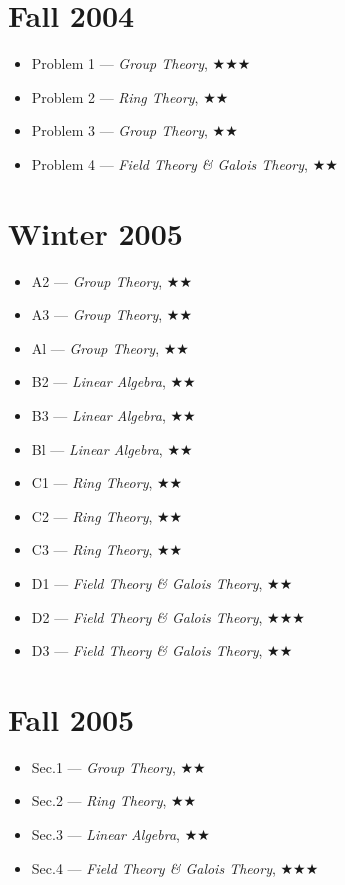 \documentclass[11pt,letterpaper]{book}
\begin{document}
\section*{Fall 2004}
\begin{itemize}
\item Problem 1 --- \textit{Group Theory}, $\bigstar\bigstar\bigstar$
\item Problem 2 --- \textit{Ring Theory}, $\bigstar\bigstar$
\item Problem 3 --- \textit{Group Theory}, $\bigstar\bigstar$
\item Problem 4 --- \textit{Field Theory \& Galois Theory}, $\bigstar\bigstar$
\end{itemize}

\section*{Winter 2005}
\begin{itemize}
\item A2 --- \textit{Group Theory}, $\bigstar\bigstar$
\item A3 --- \textit{Group Theory}, $\bigstar\bigstar$
\item Al --- \textit{Group Theory}, $\bigstar\bigstar$
\item B2 --- \textit{Linear Algebra}, $\bigstar\bigstar$
\item B3 --- \textit{Linear Algebra}, $\bigstar\bigstar$
\item Bl --- \textit{Linear Algebra}, $\bigstar\bigstar$
\item C1 --- \textit{Ring Theory}, $\bigstar\bigstar$
\item C2 --- \textit{Ring Theory}, $\bigstar\bigstar$
\item C3 --- \textit{Ring Theory}, $\bigstar\bigstar$
\item D1 --- \textit{Field Theory \& Galois Theory}, $\bigstar\bigstar$
\item D2 --- \textit{Field Theory \& Galois Theory}, $\bigstar\bigstar\bigstar$
\item D3 --- \textit{Field Theory \& Galois Theory}, $\bigstar\bigstar$
\end{itemize}

\section*{Fall 2005}
\begin{itemize}
\item Sec.1 --- \textit{Group Theory}, $\bigstar\bigstar$
\item Sec.2 --- \textit{Ring Theory}, $\bigstar\bigstar$
\item Sec.3 --- \textit{Linear Algebra}, $\bigstar\bigstar$
\item Sec.4 --- \textit{Field Theory \& Galois Theory}, $\bigstar\bigstar\bigstar$
\end{itemize}
\end{document}
